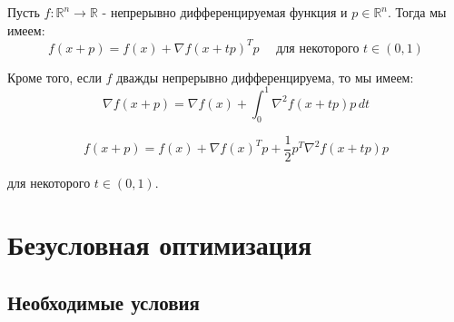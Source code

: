 \documentclass[
  russian,
  letterpaper,
  DIV=11,
  numbers=noendperiod]{scrartcl}
\begin{document}
\begin{tcolorbox}[enhanced jigsaw, opacityback=0, opacitybacktitle=0.6, toptitle=1mm, leftrule=.75mm, bottomrule=.15mm, colbacktitle=quarto-callout-color!10!white, breakable, title=\textcolor{quarto-callout-color}{\faInfo}\hspace{0.5em}{Теорема Тейлора}, left=2mm, bottomtitle=1mm, colback=white, titlerule=0mm, arc=.35mm, rightrule=.15mm, toprule=.15mm, coltitle=black, colframe=quarto-callout-color-frame]

Пусть \(f: \mathbb{R}^n \to \mathbb{R}\) - непрерывно дифференцируемая
функция и \(p \in \mathbb{R}^n\). Тогда мы имеем: \[
f(x + p) = f(x) + \nabla f(x + tp)^T p \quad \text{ для некоторого } t \in (0, 1)
\]

Кроме того, если \(f\) дважды непрерывно дифференцируема, то мы имеем:
\[
\nabla f(x + p) = \nabla f(x) + \int_0^1 \nabla^2 f(x + tp)p \, dt
\]

\[
f(x + p) = f(x) + \nabla f(x)^T p + \frac{1}{2} p^T \nabla^2 f(x + tp) p
\]

для некоторого \(t \in (0, 1)\).

\end{tcolorbox}

\section{Безусловная
оптимизация}\label{ux431ux435ux437ux443ux441ux43bux43eux432ux43dux430ux44f-ux43eux43fux442ux438ux43cux438ux437ux430ux446ux438ux44f}

\subsection{Необходимые
условия}\label{ux43dux435ux43eux431ux445ux43eux434ux438ux43cux44bux435-ux443ux441ux43bux43eux432ux438ux44f}
\end{document}
